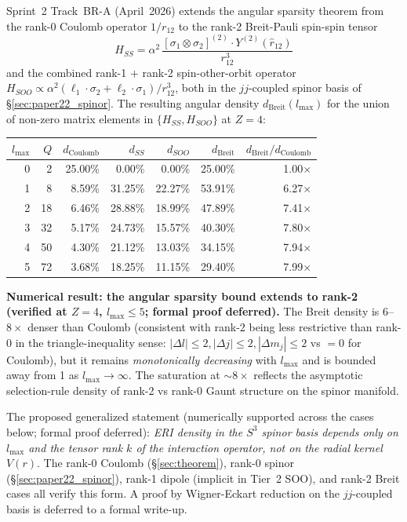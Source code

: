\documentclass[twocolumn,pra,amsmath,amssymb,superscriptaddress]{revtex4-2}
\begin{document}
Sprint~2 Track~BR-A (April~2026) extends the angular sparsity theorem
from the rank-0 Coulomb operator $1/r_{12}$ to the rank-2 Breit-Pauli
spin-spin tensor
\[
  H_{SS} = \alpha^2\,\frac{[\sigma_1 \otimes \sigma_2]^{(2)} \cdot Y^{(2)}(\hat r_{12})}{r_{12}^3}
\]
and the combined rank-1 $+$ rank-2 spin-other-orbit operator
$H_{SOO} \propto \alpha^2 (\ell_1 \cdot \sigma_2 + \ell_2 \cdot \sigma_1)/r_{12}^3$,
both in the $jj$-coupled spinor basis of \S\ref{sec:paper22_spinor}.
The resulting angular density $d_{\mathrm{Breit}}(l_{\max})$ for the
union of non-zero matrix elements in $\{H_{SS}, H_{SOO}\}$ at $Z=4$:

\begin{center}
\begin{tabular}{|r|r|r|r|r|r|r|}
\hline
$l_{\max}$ & $Q$ & $d_{\mathrm{Coulomb}}$ & $d_{SS}$ & $d_{SOO}$ & $d_{\mathrm{Breit}}$ & $d_{\mathrm{Breit}}/d_{\mathrm{Coulomb}}$ \\
\hline
0 &  2 & 25.00\% &  0.00\% &  0.00\% & 25.00\% & 1.00$\times$ \\
1 &  8 &  8.59\% & 31.25\% & 22.27\% & 53.91\% & 6.27$\times$ \\
2 & 18 &  6.46\% & 28.88\% & 18.99\% & 47.89\% & 7.41$\times$ \\
3 & 32 &  5.17\% & 24.73\% & 15.57\% & 40.30\% & 7.80$\times$ \\
4 & 50 &  4.30\% & 21.12\% & 13.03\% & 34.15\% & 7.94$\times$ \\
5 & 72 &  3.68\% & 18.25\% & 11.15\% & 29.40\% & 7.99$\times$ \\
\hline
\end{tabular}
\end{center}

\textbf{Numerical result: the angular sparsity bound extends to rank-2 (verified at $Z=4$, $l_{\max} \le 5$; formal proof deferred).}
The Breit density is $6$--$8\times$ denser than Coulomb (consistent with
rank-2 being less restrictive than rank-0 in the triangle-inequality
sense: $|\Delta l| \leq 2, |\Delta j| \leq 2, |\Delta m_j| \leq 2$ vs
$= 0$ for Coulomb), but it remains \emph{monotonically decreasing} with
$l_{\max}$ and is bounded away from 1 as $l_{\max} \to \infty$. The
saturation at $\sim 8\times$ reflects the asymptotic selection-rule
density of rank-2 vs rank-0 Gaunt structure on the spinor manifold.

The proposed generalized statement (numerically supported across the
cases below; formal proof deferred): \emph{ERI density in the $S^3$
spinor basis depends only on $l_{\max}$ and the tensor rank $k$ of the
interaction operator, not on the radial kernel $V(r)$}. The rank-0
Coulomb (\S\ref{sec:theorem}), rank-0 spinor (\S\ref{sec:paper22_spinor}),
rank-1 dipole (implicit in Tier~2 SOO), and rank-2 Breit cases all
verify this form. A proof by Wigner-Eckart reduction on the $jj$-coupled
basis is deferred to a formal write-up.
\end{document}
